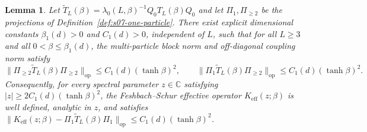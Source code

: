 \documentclass[11pt]{article}
\newtheorem{lemma}[theorem]{Lemma}
\theoremstyle{definition}
\begin{document}
\begin{lemma}
\label{lem:s07-proj-norm}
Let $\widetilde{T}_L(\beta) = \lambda_0(L, \beta)^{-1} Q_0 T_L(\beta) Q_0$ and let
$\Pi_1, \Pi_{\ge 2}$ be the projections of Definition~\ref{def:s07-one-particle}.
There exist explicit dimensional constants $\beta_1(d) > 0$ and $C_1(d) > 0$,
independent of $L$, such that for all $L \ge 3$ and all $0 < \beta \le \beta_1(d)$,
the multi-particle block norm and off-diagonal coupling norm satisfy
\begin{equation}
\label{eq:s07-schur-op}
  \bigl\|\Pi_{\ge 2} \widetilde{T}_L(\beta) \Pi_{\ge 2}\bigr\|_{\mathrm{op}} \le C_1(d) (\tanh \beta)^2, \qquad \bigl\|\Pi_1 \widetilde{T}_L(\beta) \Pi_{\ge 2}\bigr\|_{\mathrm{op}} \le C_1(d) (\tanh \beta)^2.
\end{equation}
Consequently, for every spectral parameter $z \in \mathbb{C}$ satisfying $|z| \ge 2
C_1(d) (\tanh \beta)^2$, the Feshbach--Schur effective operator $K_{\mathrm{eff}}(z;
\beta)$ is well defined, analytic in $z$, and satisfies $\|K_{\mathrm{eff}}(z;
\beta) - \Pi_1 \widetilde{T}_L(\beta) \Pi_1\|_{\mathrm{op}} \le C_1(d) (\tanh
\beta)^2$.
\end{lemma}
\end{document}

